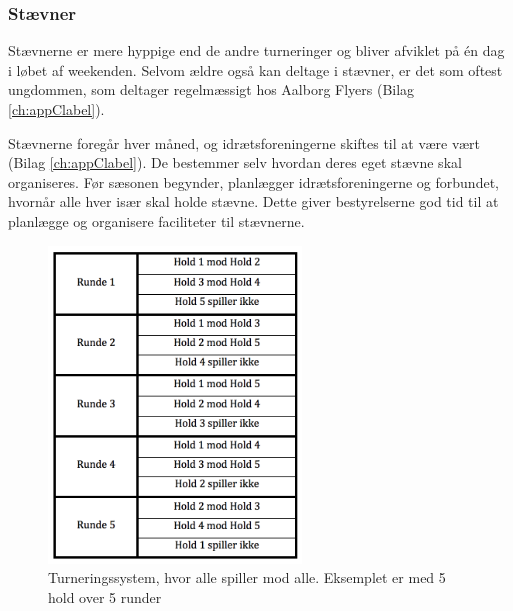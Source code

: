 \subsubsection{Stævner}\label{staevner}
Stævnerne er mere hyppige end de andre turneringer og bliver afviklet på én dag i løbet af weekenden. Selvom ældre også kan deltage i stævner, er det som oftest ungdommen, som deltager regelmæssigt hos Aalborg Flyers (Bilag \ref{ch:appClabel}).
\par
Stævnerne foregår hver måned, og idrætsforeningerne skiftes til at være vært (Bilag \ref{ch:appClabel}). De bestemmer selv hvordan deres eget stævne skal organiseres. Før sæsonen begynder, planlægger idrætsforeningerne og forbundet, hvornår alle hver især skal holde stævne. Dette giver bestyrelserne god tid til at planlægge og organisere faciliteter til stævnerne. 
\\
\begin{figure}[H]
  \centering
  \includegraphics[width=0.6\textwidth]{figures/RoundRobin.png}
  \caption{Turneringssystem, hvor alle spiller mod alle. Eksemplet er med 5 hold over 5 runder}
  \label{fig:RoundRobin}
\end{figure}

